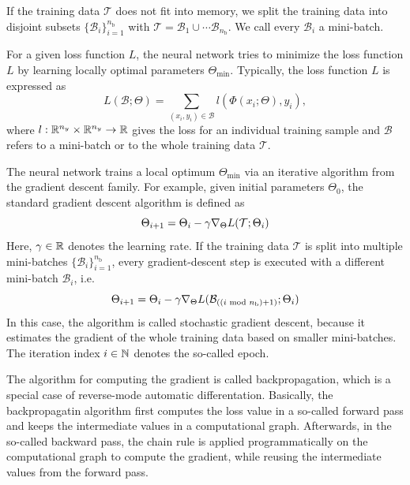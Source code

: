 \documentclass[twoside,a4paper]{article}
\begin{document}
If the training data $\mathcal{T}$ does not fit into memory,
we split the training data into disjoint subsets
$\{ \mathcal{B}_i \}_{i=1}^{n_{\text{b}}}$ with
$\mathcal{T} = \mathcal{B}_1 \cup \cdots \mathcal{B}_{n_{\text{b}}}$.
We call every $\mathcal{B}_i$ a mini-batch.

For a given loss function $L$, the neural network tries to minimize the loss 
function $L$ by learning locally optimal parameters $\Theta_{\text{min}}$.
Typically, the loss function $L$ is expressed as
\begin{equation*}
	L(\mathcal{B}; \Theta) = \sum_{(x_i,y_i) \in \mathcal{B}} l(\Phi(x_i; \Theta), y_i),
\end{equation*}
where $l : \R^{n_y} \times \R^{n_y} \to \R$ gives the loss for an 
individual training sample and $\mathcal{B}$ refers to a mini-batch
or to the whole training data $\mathcal{T}$.

The neural network trains a local optimum $\Theta_{\text{min}}$ via
an iterative algorithm from the gradient descent family. For example, given
initial parameters $\Theta_0$, the standard gradient descent algorithm is defined as
\begin{equation*}
	\Theta_{i+1} = \Theta_i - \gamma \grad[\Theta]{L(\mathcal{T};\Theta_{i})}
\end{equation*}
Here, $\gamma \in \R$ denotes the learning rate.
If the training data $\mathcal{T}$ is split into multiple mini-batches 
$\{ \mathcal{B}_i \}_{i=1}^{n_{\text{b}}}$, every gradient-descent step
is executed with a different mini-batch $\mathcal{B}_i$, i.e.
\begin{equation*}
	\Theta_{i+1} = \Theta_i - \gamma \grad[\Theta]{L(
		\mathcal{B}_{((i \textrm{ mod } n_{\text{b}}) + 1)};
		\Theta_{i})}
\end{equation*}
In this case, the algorithm is called stochastic gradient descent, because it estimates
the gradient of the whole training data based on smaller mini-batches.
The iteration index $i \in \N$ denotes the so-called epoch.

The algorithm for computing the gradient is called backpropagation, which
is a special case of reverse-mode automatic differentation.
Basically, the backpropagatin algorithm first computes the loss value 
in a so-called forward pass
and keeps the intermediate values in a computational graph.
Afterwards, in the so-called backward pass, the chain rule is applied programmatically
on the computational graph to compute the gradient, while reusing the intermediate values
from the forward pass.
\end{document}
